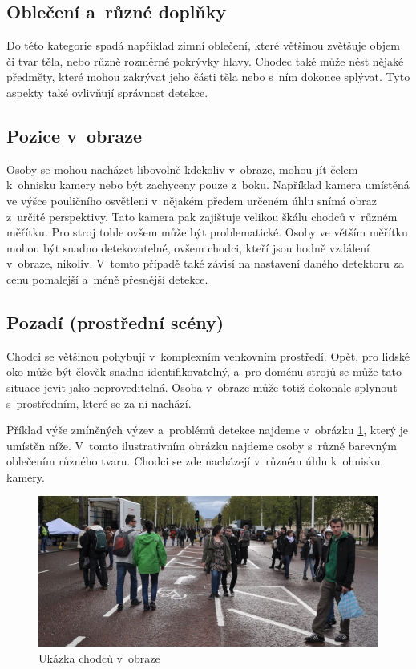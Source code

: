 \subsection{Oblečení a~různé doplňky}
Do této kategorie spadá například zimní oblečení, které většinou zvětšuje objem či tvar těla, nebo různě rozměrné pokrývky hlavy. Chodec také může nést nějaké předměty, které mohou zakrývat jeho části těla nebo s~ním dokonce splývat. Tyto aspekty také ovlivňují správnost detekce.

\subsection{Pozice v~obraze}
Osoby se mohou nacházet libovolně kdekoliv v~obraze, mohou jít čelem k~ohnisku kamery nebo být zachyceny pouze z~boku. Například kamera umístěná ve výšce pouličního osvětlení v~nějakém předem určeném úhlu snímá obraz z~určité perspektivy. Tato kamera pak zajištuje velikou škálu chodců v~různém měřítku. Pro stroj tohle ovšem může být problematické. Osoby ve větším měřítku mohou být snadno detekovatelné, ovšem chodci, kteří jsou hodně vzdálení v~obraze, nikoliv. V~tomto případě také závisí na nastavení daného detektoru za cenu pomalejší a~méně přesnější detekce. 

\subsection{Pozadí (prostřední scény)}
Chodci se většinou pohybují v~komplexním venkovním prostředí. Opět, pro lidské oko může být člověk snadno identifikovatelný, a~pro doménu strojů se může tato situace jevit jako neproveditelná. Osoba v~obraze může totiž dokonale splynout s~prostředním, které se za ní nachází.  

Příklad výše zmíněných výzev a~problémů detekce najdeme v~obrázku \ref{pedestrians}, který je umístěn níže. V~tomto ilustrativním obrázku najdeme osoby s~různě barevným oblečením různého tvaru. Chodci se zde nacházejí v~různém úhlu k~ohnisku kamery. 

\begin{figure}[H]
\centering
\includegraphics[width=15cm]{figures/pedestrians}
\caption{Ukázka chodců v~obraze}
\label{pedestrians}
\end{figure}